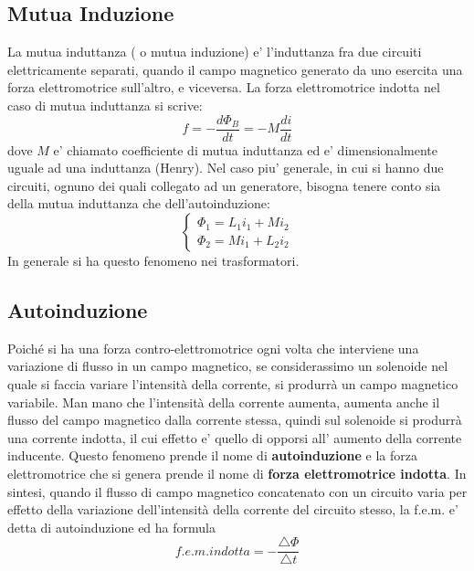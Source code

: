 \documentclass[a4paper, 10pt]{article}
\begin{document}
		\subsection{Mutua Induzione}
			La mutua induttanza ( o mutua induzione) e' l'induttanza fra due circuiti elettricamente separati, quando il 
			campo magnetico generato da uno esercita una forza elettromotrice sull'altro, e viceversa. La forza elettromotrice
			indotta nel caso di mutua induttanza si scrive:
			\[ f = - \frac{d \Phi_B}{dt} = - M \frac{di}{dt} \] dove $M$ e' chiamato coefficiente di mutua induttanza ed e'
			dimensionalmente uguale ad una induttanza (Henry). Nel caso piu' generale, in cui si hanno due circuiti, ognuno
			dei quali collegato ad un generatore, bisogna tenere conto sia della mutua induttanza che dell'autoinduzione:
			\[ \begin{cases} \Phi_1 = L_1 i_1 + Mi_2 \\ \Phi_2 = Mi_1 + L_2i_2 \end{cases} \] In generale si ha questo fenomeno
			nei trasformatori.
		\subsection{Autoinduzione}
			Poiché si ha una forza contro-elettromotrice ogni volta che interviene una variazione di flusso in un campo magnetico, 
			se considerassimo un solenoide nel quale si faccia variare l'intensità della corrente, si produrrà un campo magnetico
			variabile. Man mano che l'intensità della corrente aumenta, aumenta anche il flusso del campo magnetico dalla 
			corrente stessa, quindi sul solenoide si produrrà una corrente indotta, il cui effetto e' quello di opporsi all'
			aumento della corrente inducente. Questo fenomeno prende il nome di \textbf{autoinduzione} e la forza elettromotrice
			che si genera prende il nome di \textbf{forza elettromotrice indotta}. 
			In sintesi, quando il flusso di campo magnetico concatenato con un circuito varia per effetto della variazione 
			dell'intensità della corrente del circuito stesso, la f.e.m. e' detta di autoinduzione ed ha formula 
			\[ f.e.m. indotta = -\frac{\triangle \Phi}{\triangle t} \]
\end{document}

